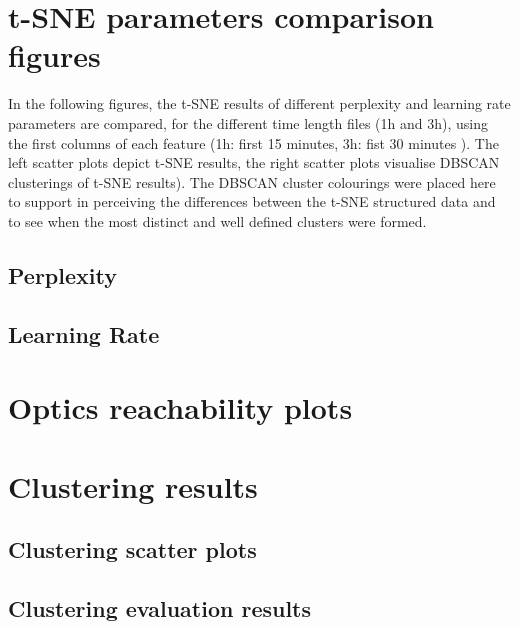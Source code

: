 \begin{appendices}

\section{t-SNE parameters comparison figures}
\label{appendix:tSNEParameters}
In the following figures, the t-SNE results of different perplexity and learning rate parameters are compared, for the different time length files (1h and 3h), using the first columns of each feature (1h: first 15 minutes, 3h: fist 30 minutes ). The left scatter plots depict t-SNE results, the right scatter plots visualise DBSCAN clusterings of t-SNE results). The DBSCAN cluster colourings were placed here to support in perceiving the differences between the t-SNE structured data and to see when the most distinct and well defined clusters were formed.

	\subsection{Perplexity}
	\label{appendix:tSNEParametersPerplexity}
	

	\subsection{Learning Rate}
	\label{appendix:tSNEParametersLearningRate}
	


\section{Optics reachability plots}
\label{appendix:OPTICSReachabilityPlots}


\section{Clustering results}

	\subsection{Clustering scatter plots}
	\label{appendix:clusteringResults}
	

	\subsection{Clustering evaluation results}
	\label{appendix:clusteringEvaluationResults}
	




\end{appendices}
